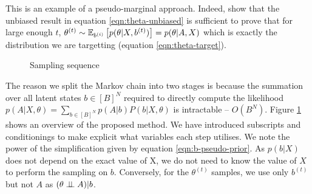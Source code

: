 %
This is an example of a pseudo-marginal approach. Indeed, \citet{pseudo-marginal} show that the unbiased result in equation \ref{eqn:theta-unbiased} is sufficient to prove that for large enough $t$, $\theta^{(t)} \sim \mathbb{E}_{b^{(i)}} \left[ p(\theta | X, b^{(t)})\right] = p(\theta 
| A, X)$ which is exactly the distribution we are targetting (equation \ref{eqn:theta-target}).
%
\begin{figure}[!h]
	\centering

	\caption{Sampling sequence}
	\label{fig:samp-sequence}
\end{figure}

The reason we split the Markov chain into two stages is because the summation over all latent states $b \in [B]^N$ required to directly compute the likelihood $p(A| X, \theta) = \sum_{b \in [B]^N} p(A | b) P(b | X, \theta)$ is intractable -- $O(B^N)$. Figure \ref{fig:samp-sequence} shows an overview of the proposed method. We have introduced subscripts and conditionings to make explicit what variables each step utilises. We note the power of the simplification given by equation \ref{eqn:b-pseudo-prior}. As $p(b| X)$ does not depend on the exact value of X, we do not need to know the value of $X$ to perform the sampling on $b$. Conversely, for the $\theta^{(t)}$ samples, we use only $b^{(t)}$ but not $A$ as $(\theta \perp \!\!\! \perp A) | b$.

